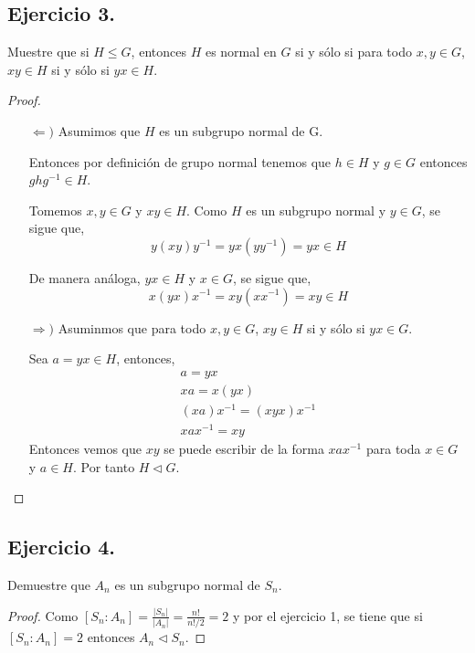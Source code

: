 \documentclass[11pt,letterpaper]{article}
\begin{document}
\subsection*{Ejercicio 3.}
Muestre que si $H \leq G$, entonces $H$ es normal en $G$ si y sólo si para todo
$x, y \in G$, $xy \in H$ si y sólo si $yx \in H$.
\begin{proof}
\hfill
\begin{itemize}
    \item[$\Longleftarrow)$] Asumimos que $H$ es un subgrupo normal de G.

    Entonces por definición de grupo normal tenemos que $h \in H$ y $g \in G$ entonces
    $ghg^{-1} \in H$.
    
    Tomemos $x, y \in G$ y $xy \in H$. Como $H$ es un subgrupo normal y $y \in G$, se sigue que,
    \[ y(xy)y^{-1} = yx(yy^{-1}) = yx \in H \]

    De manera análoga, $yx \in H$ y $x \in G$, se sigue que,
    \[ x(yx)x^{-1} = xy(xx^{-1}) = xy \in H \]

    \item[$\Longrightarrow)$] Asuminmos que para todo $x, y \in G$, $xy \in H$ si
    y sólo si $yx \in G$.

    Sea $a = yx \in H$, entonces,
    \begin{align*}
        a = yx\\
        xa = x(yx)\\
        (xa)x^{-1} = (xyx)x^{-1}\\
        xax^{-1} = xy
    \end{align*}
    Entonces vemos que $xy$ se puede escribir de la forma $xax^{-1}$ para toda $x \in G$
    y $a \in H$. Por tanto $H \lhd G$.
\end{itemize}
\end{proof}

\subsection*{Ejercicio 4.}
Demuestre que $A_n$ es un subgrupo normal de $S_n$.
\begin{proof}
    Como $[S_n : A_n] = \frac{|S_n|}{|A_n|} = \frac{n!}{n!/2} = 2$ y por el ejercicio 1, se tiene que
    si $[S_n : A_n] = 2$ entonces $A_n \lhd S_n$.
\end{proof}




\end{document}
